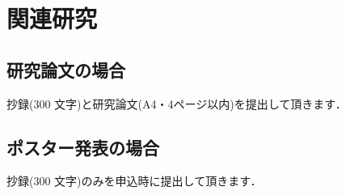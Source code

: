 \section{関連研究}
\subsection{研究論文の場合}
抄録(300 文字)と研究論文(A4・4ページ以内)を提出して頂きます．

\subsection{ポスター発表の場合}
抄録(300 文字)のみを申込時に提出して頂きます．